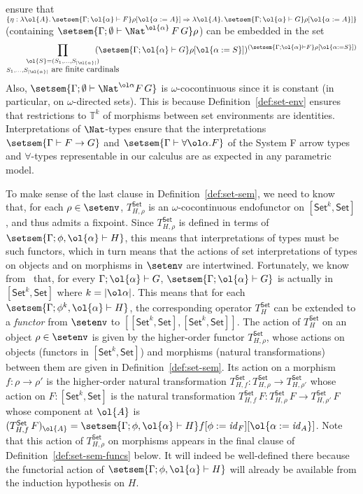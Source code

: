 \documentclass{lmcs}
\theoremstyle{plain}\newtheorem{satz}[thm]{Satz}
\newcommand{\set}{\mathsf{Set}}
\renewcommand{\id}{\mathit{id}}
\begin{document}
ensure that $\{\eta : \lambda \ol{A}.\,\setsem{\Gamma;\ol{\alpha}
  \vdash F}\rho[\ol{\alpha := A}] \Rightarrow \lambda
\ol{A}.\,\setsem{\Gamma;\ol{\alpha} \vdash G}\rho[\ol{\alpha := A}]\}$
(containing $\setsem{\Gamma;\emptyset \vdash
  \Nat^{\ol{\alpha}}\,F\,G}\rho$) can be embedded in the set
\[ \prod_{\substack{\ol{S} =
    (S_1,...,S_{|\ol{\alpha}|})\\ S_1,...,S_{|\ol{\alpha}|} \mbox{ are
      finite cardinals}}} \hspace*{-0.4in}(\setsem{\Gamma;\ol{\alpha}
  \vdash G}\rho[\ol{\alpha := S}])^{(\setsem{\Gamma;\ol{\alpha} \vdash
    F}\rho[\ol{\alpha := S}])}\] Also, $\setsem{\Gamma; \emptyset
  \vdash \Nat^{\ol\alpha} F\,G}$ is $\omega$-cocontinuous since it is
constant (in particular, on $\omega$-directed sets). This is because
Definition~\ref{def:set-env} ensures that restrictions to
$\mathbb{T}^k$ of morphisms between set environments are identities.
Interpretations of $\Nat$-types ensure that the interpretations
$\setsem{\Gamma \vdash F \to G}$ and $\setsem{\Gamma \vdash \forall
  \ol\alpha. F}$ of the System F arrow types and $\forall$-types
representable in our calculus are as expected in any parametric model.

To make sense of the last clause in Definition~\ref{def:set-sem}, we
need to know that, for each $\rho \in \setenv$, $T^\set_{H,\rho}$ is
an $\omega$-cocontinuous endofunctor on $[\set^k, \set]$, and thus
admits a fixpoint.  Since $T_{H,\rho}^\set$ is defined in terms of
$\setsem{\Gamma;\phi, \ol{\alpha} \vdash H}$, this means that
interpretations of types must be such functors, which in turn means
that the actions of set interpretations of types on objects and on
morphisms in $\setenv$ are intertwined. Fortunately, we know
from~\cite{jp19} that, for every $\Gamma; \ol{\alpha} \vdash G$,
$\setsem{\Gamma; \ol{\alpha} \vdash G}$ is actually in $[\set^k,\set]$
where $k = |\ol \alpha|$. This means that for each $\setsem{\Gamma;
  \phi^k, \ol{\alpha} \vdash H}$, the corresponding operator
$T^\set_{H}$ can be extended to a {\em functor} from $\setenv$ to
$[[\set^k,\set],[\set^k,\set]]$. The action of $T^\set_H$ on an object
$\rho \in \setenv$ is given by the higher-order functor
$T_{H,\rho}^\set$, whose actions on objects (functors in $[\set^k,
  \set]$) and morphisms (natural transformations) between them are
given in Definition~\ref{def:set-sem}. Its action on a morphism $f :
\rho \to \rho'$ is the higher-order natural transformation
$T^\set_{H,f} : T^\set_{H,\rho} \to T^\set_{H,\rho'}$ whose action on
$F : [\set^k,\set]$ is the natural transformation $T^\set_{H,f}\, F :
T^\set_{H,\rho}\,F \to T^\set_{H,\rho'}\,F$ whose component at
$\ol{A}$ is $(T^\set_{H,f}\, F)_{\ol{A}} = \setsem{\Gamma;
  \phi,\ol{\alpha} \vdash H}f[\phi := \id_F][\ol{\alpha := \id_A}]$.
Note that this action of $T_{H,\rho}^\set$ on morphisms appears in the
final clause of Definition~\ref{def:set-sem-funcs} below. It will
indeed be well-defined there because the functorial action of
$\setsem{\Gamma; \phi,\ol{\alpha} \vdash H}$ will already be available
from the induction hypothesis on $H$.
\end{document}
